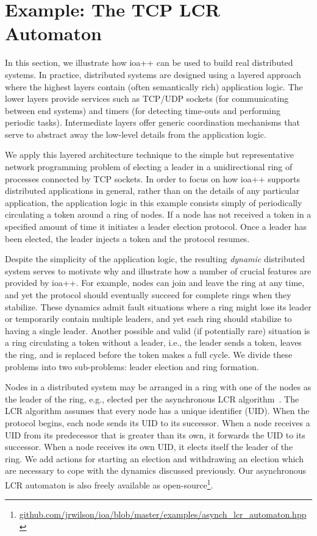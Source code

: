 \section{Example:  The TCP LCR Automaton\label{case_study}}

In this section, we illustrate how ioa++ can be used to build real distributed systems.
In practice, distributed systems are designed using a layered approach where the highest layers contain (often semantically rich) application logic.
The lower layers provide services such as TCP/UDP sockets (for communicating between end systems) and timers (for detecting time-outs and performing periodic tasks).
Intermediate layers offer generic coordination mechanisms that serve to abstract away the low-level details from the application logic.

We apply this layered architecture technique to the simple but representative network programming problem of electing a leader in a unidirectional ring of processes connected by TCP sockets.  
In order to focus on how ioa++ supports distributed applications in general, rather than on the details of any
particular application, the application logic in this example consists simply of periodically circulating a token around a ring of nodes.
If a node has not received a token in a specified amount of time it initiates a leader election protocol.
Once a leader has been elected, the leader injects a token and the protocol resumes.

Despite the simplicity of the application logic, the resulting \emph{dynamic} distributed system serves to motivate why and illustrate how a number of crucial features are provided by ioa++.
For example, nodes can join and leave the ring at any time, and yet the protocol should eventually succeed for complete rings when they stabilize.
These dynamics admit fault situations where a ring might lose its leader or temporarily contain multiple leaders, and yet each ring should stabilize to having a single leader.
Another possible and valid (if potentially rare) situation is a ring circulating a token without a leader, i.e., the leader sends a token, leaves the ring, and is replaced before the token makes a full cycle.
We divide these problems into two sub-problems:  leader election and ring formation.

Nodes in a distributed system may be arranged in a ring with one of the nodes as the leader of the ring, e.g., elected per the asynchronous LCR algorithm~\cite{lynch1996distributed}.
The LCR algorithm assumes that every node has a unique identifier (UID).
When the protocol begins, each node sends its UID to its successor.
When a node receives a UID from its predecessor that is greater than its own, it forwards the UID to its successor.
When a node receives its own UID, it elects itself the leader of the ring.
We add actions for starting an election and withdrawing an election which are necessary to cope with the dynamics discussed previously.
Our asynchronous LCR automaton is also freely available as open-source\footnote{\url{github.com/jrwilson/ioa/blob/master/examples/asynch_lcr_automaton.hpp}}.

